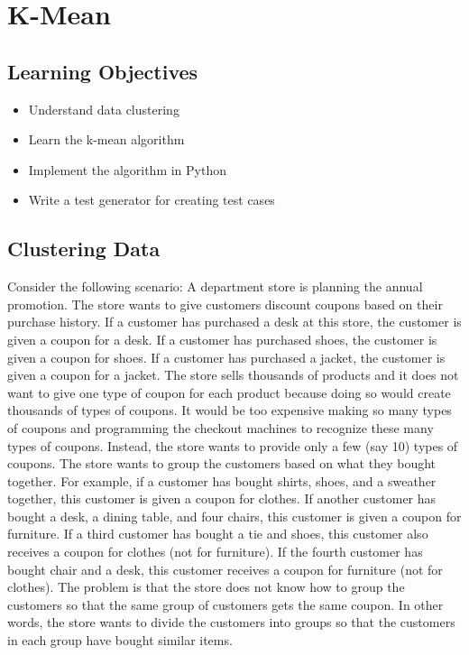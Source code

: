 \chapter{K-Mean}

\section{Learning Objectives}

\begin{itemize}

\item Understand data clustering  
  
\item Learn the k-mean algorithm

\item Implement the algorithm in Python

\item Write a test generator for creating test cases
  
\end{itemize}

\section{Clustering Data}

Consider the following scenario: A department store is planning the
annual promotion. The store wants to give customers discount coupons
based on their purchase history.  If a customer has purchased a desk
at this store, the customer is given a coupon for a desk.
 If a customer has purchased shoes,
the customer is given a coupon for shoes.  If a customer has purchased
a jacket, the customer is given a coupon for a jacket.  The store
sells thousands of products and it does not want to give one type of
coupon for each product because doing so would create thousands of
types of coupons.  It would be too expensive making so many types of
coupons and programming the checkout machines to recognize these many
types of coupons.  Instead, the store wants to provide only a few (say
10) types of coupons.  The store wants to group the customers based on
what they bought together.  For example, if a customer has bought
shirts, shoes, and a sweather together, this customer is given a
coupon for clothes.  If another customer has bought a desk, a dining
table, and four chairs, this customer is given a coupon for furniture.
If a third customer has bought a tie and shoes, this customer also
receives a coupon for clothes (not for furniture).  If the fourth
customer has bought chair and a desk, this customer receives a coupon
for furniture (not for clothes).  The problem is that the store does
not know how to group the customers so that the same group of
customers gets the same coupon.  In other words, the store wants to
divide the customers into groups so that the customers in each group
have bought similar items. 

